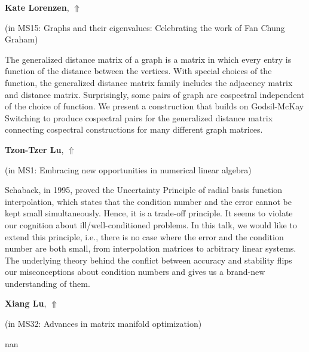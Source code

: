 \documentclass[ILAS2025-program.tex]{subfiles}
\begin{document}
\hypertarget{down0028}{}\begin{ilasabstract}
    
\textbf{Kate Lorenzen},  \hfill \hyperlink{up0028}{$\Uparrow$}
    
    
(in {\color{mstitle}MS15: Graphs and their eigenvalues: Celebrating the work of Fan Chung Graham})
        
\mtskip
    The generalized distance matrix of a graph is a matrix in which every entry is function of the distance between the vertices. With special choices of the function, the generalized distance matrix family includes the adjacency matrix and distance matrix. Surprisingly, some pairs of graph are cospectral independent of the choice of function.  We present a construction that builds on Godsil-McKay Switching to produce cospectral pairs for the generalized distance matrix connecting cospectral constructions for many different graph matrices.

\end{ilasabstract}
    

\hypertarget{down0070}{}\begin{ilasabstract}
    
\textbf{Tzon-Tzer Lu},  \hfill \hyperlink{up0070}{$\Uparrow$}
    
    
(in {\color{mstitle}MS1: Embracing new opportunities in numerical linear algebra})
        
\mtskip
    Schaback, in 1995, proved the Uncertainty Principle of radial basis function interpolation, which states that the condition number and the error cannot be kept small simultaneously. Hence, it is a trade-off principle. It seems to violate our cognition about ill/well-conditioned problems. In this talk, we would like to extend this principle, i.e., there is no case where the error and the condition number are both small, from interpolation matrices to arbitrary linear systems. The underlying theory behind the conflict between accuracy and stability flips our misconceptions about condition numbers and gives us a brand-new understanding of them. 
\end{ilasabstract}
    

\hypertarget{down0188}{}\begin{ilasabstract}
    
\textbf{Xiang Lu},  \hfill \hyperlink{up0188}{$\Uparrow$}
    
    
(in {\color{mstitle}MS32: Advances in matrix manifold optimization})
        
\mtskip
    nan
\end{ilasabstract}
    
\end{document}
